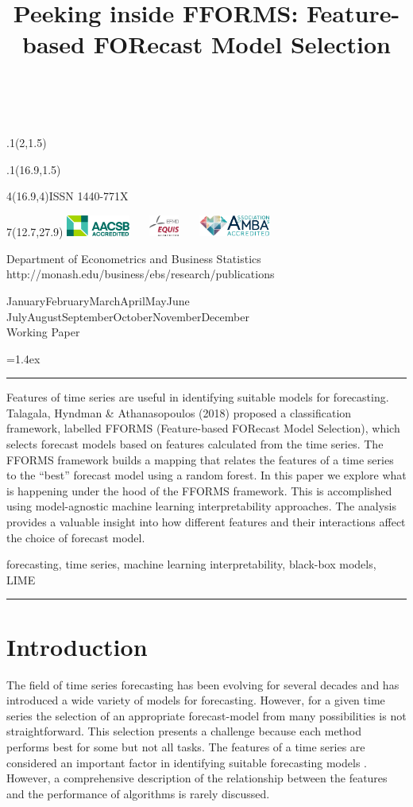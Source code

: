 \documentclass[11pt,a4paper,]{article}
\title{Peeking inside FFORMS: Feature-based FORecast Model Selection}
\date{\sf\Date~\Month~\Year}
\makeatletter
\def\Date{\number\day}
\def\Month{\ifcase\month\or
 January\or February\or March\or April\or May\or June\or
 July\or August\or September\or October\or November\or December\fi}
\def\Year{\number\year}
\def\showjel{{\large\textsf{\textbf{JEL classification:}}~\@jel}}
\def\cover{{\sffamily\setcounter{page}{0}
        \thispagestyle{empty}
        \placefig{2}{1.5}{width=5cm}{monash2}
        \placefig{16.9}{1.5}{width=2.1cm}{MBusSchool}
        \begin{textblock}{4}(16.9,4)ISSN 1440-771X\end{textblock}
        \begin{textblock}{7}(12.7,27.9)\hfill
        \includegraphics[height=0.7cm]{AACSB}~~~
        \includegraphics[height=0.7cm]{EQUIS}~~~
        \includegraphics[height=0.7cm]{AMBA}
        \end{textblock}
        \vspace*{2cm}
        \begin{center}\Large
        Department of Econometrics and Business Statistics\\[.5cm]
        \footnotesize http://monash.edu/business/ebs/research/publications
        \end{center}\vspace{2cm}
        \begin{center}
        \fbox{\parbox{14cm}{\begin{onehalfspace}\centering\Huge\vspace*{0.3cm}
                \textsf{\textbf{\expandafter{\@title}}}\vspace{1cm}\par
                \LARGE\@author\end{onehalfspace}
        }}
        \end{center}
        \vfill
                \begin{center}\Large
                \Month~\Year\\[1cm]
                Working Paper \@wp
        \end{center}\vspace*{2cm}}}
\def\pageone{{\sffamily\setstretch{1}%
        \thispagestyle{empty}%
        \vbox to \textheight{%
        \raggedright\baselineskip=1.2cm
     {\fontsize{24.88}{30}\sffamily\textbf{\expandafter{\@title}}}
        \vspace{2cm}\par
        \hspace{1cm}\parbox{14cm}{\sffamily\large\@addresses}\vspace{1cm}\vfill
        \hspace{1cm}{\large\Date~\Month~\Year}\\[1cm]
        \hspace{1cm}\showjel\vss}}}
\def\blindtitle{{\sffamily
     \thispagestyle{plain}\raggedright\baselineskip=1.2cm
     {\fontsize{24.88}{30}\sffamily\textbf{\expandafter{\@title}}}\vspace{1cm}\par
        }}
\def\titlepage{{\cover\newpage\pageone\newpage\blindtitle}}
\let\maketitle\titlepage
\newenvironment{keywords}{\par\vspace{0.5cm}\noindent{\sffamily\textbf{Keywords:}}}{\vspace{0.25cm}\par\hrule\vspace{0.5cm}\par}
\renewenvironment{abstract}{\begin{minipage}{\textwidth}\parskip=1.4ex\noindent
\hrule\vspace{0.1cm}\par{\sffamily\textbf{\abstractname}}\newline}
  {\end{minipage}}
\def\placefig#1#2#3#4{\begin{textblock}{.1}(#1,#2)\rlap{\texttt{[image: \#4]}}\end{textblock}}
\makeatother
\begin{document}
\maketitle
\begin{abstract}
Features of time series are useful in identifying suitable models for forecasting. Talagala, Hyndman \& Athanasopoulos (2018) proposed a classification framework, labelled FFORMS (Feature-based FORecast Model Selection), which selects forecast models based on features calculated from the time series. The FFORMS framework builds a mapping that relates the features of a time series to the ``best'' forecast model using a random forest. In this paper we explore what is happening under the hood of the FFORMS framework. This is accomplished using model-agnostic machine learning interpretability approaches. The analysis provides a valuable insight into how different features and their interactions affect the choice of forecast model.
\end{abstract}
\begin{keywords}
forecasting, time series, machine learning interpretability, black-box models, LIME
\end{keywords}

\hypertarget{intro}{%
\section{Introduction}\label{intro}}

The field of time series forecasting has been evolving for several decades and has introduced a wide variety of models for forecasting. However, for a given time series the selection of an appropriate forecast-model from many possibilities is not straightforward. This selection presents a challenge because each method performs best for some but not all tasks. The features of a time series are considered an important factor in identifying suitable forecasting models \autocites{collopy1992rule}{meade2000evidence}{makridakis2000m3}{wang2009rule}. However, a comprehensive description of the relationship between the features and the performance of algorithms is rarely discussed.
\end{document}
